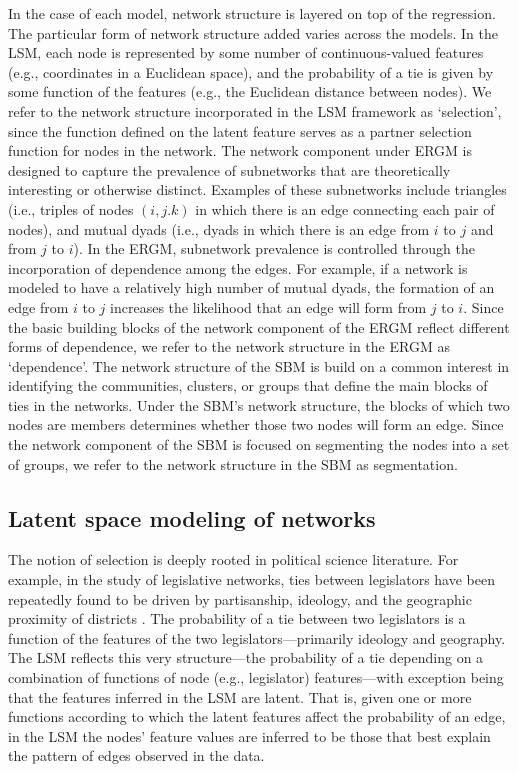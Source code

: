 \documentclass[fleqn,12pt]{wlscirep}
\begin{document}
In the case of each model, network structure is layered on top of the regression. The particular form of network structure added varies across the models. In the LSM, each node is represented by some number of continuous-valued features (e.g., coordinates in a Euclidean space), and the probability of a tie is given by some function of the features (e.g., the Euclidean distance between nodes). We refer to the network structure incorporated in the LSM framework as `selection', since the function defined on the latent feature serves as a partner selection function for nodes in the network. The network component under ERGM is designed to capture the prevalence of subnetworks that are theoretically interesting or otherwise distinct. Examples of these subnetworks include triangles (i.e., triples of nodes $(i,j.k)$ in which there is an edge connecting each pair of nodes), and mutual dyads (i.e., dyads in which there is an edge from $i$ to $j$ and from $j$ to $i$). In the ERGM, subnetwork prevalence is controlled through the incorporation of dependence among the edges. For example, if a network is modeled to have a relatively high number of mutual dyads, the formation of an edge from $i$ to $j$ increases the likelihood that an edge will form from $j$ to $i$. Since the basic building blocks of the network component of the ERGM reflect different forms of dependence, we refer to the network structure in the ERGM as `dependence'. The network structure of the SBM is build on a common interest in identifying the communities, clusters, or groups that define the main blocks of ties in the networks. Under the SBM's network structure, the blocks of which two nodes are members determines whether those two nodes will form an edge. Since the network component of the SBM is focused on segmenting the nodes into a set of groups, we refer to the network structure in the SBM as segmentation.

\subsection{Latent space modeling of networks}

The notion of selection is deeply rooted in political science literature. For example,  in  the study of legislative networks, ties between legislators have been repeatedly found to be driven by partisanship, ideology, and the geographic proximity of districts \citep{osei2018party,bratton2011networks,clark2013multimember}.   The probability of a tie between two legislators is a function of the features of the two legislators---primarily ideology and geography. The LSM reflects this very structure---the probability of a tie depending on a combination of functions of node (e.g., legislator) features---with exception being that the features inferred in the LSM are latent. That is, given one or more functions according to which the latent features affect the probability of an edge,  in the LSM the nodes' feature values are inferred to be those that best explain the pattern of edges observed in the data.
\end{document}
